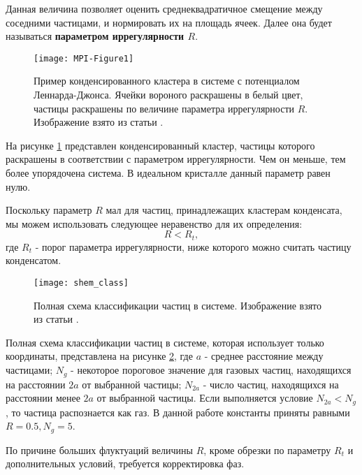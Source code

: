 Данная величина позволяет оценить среднеквадратичное смещение между соседними частицами, и нормировать их на площадь ячеек.
Далее она будет называться \textbf{параметром иррегулярности $R$}.

\begin{figure}[h]
\begin{center}
\texttt{[image: MPI-Figure1]}
\caption{Пример конденсированного кластера в системе с потенциалом Леннарда-Джонса. Ячейки вороного раскрашены в белый цвет, частицы раскрашены по величине параметра иррегулярности $R$. Изображение взято из статьи \cite{Ovcharov2017}.}
\label{risIrreg}
\end{center}
\end{figure}

На рисунке \ref{risIrreg} представлен конденсированный кластер, частицы которого раскрашены в соответствии с параметром иррегулярности. Чем он меньше, тем более упорядочена система. В идеальном кристалле данный параметр равен нулю.

Поскольку параметр $R$ мал для частиц, принадлежащих кластерам конденсата, мы можем использовать следующее неравенство для их определения:
\begin{equation}
R < R_t,
\end{equation}
где $R_t$ - порог параметра иррегулярности, ниже которого можно считать частицу конденсатом.

\begin{figure}[h]
\begin{center}
\texttt{[image: shem\_class]}
\caption{Полная схема классификации частиц в системе. Изображение взято из статьи \cite{Ovcharov2017}.}
\label{risShemClass}
\end{center}
\end{figure}

Полная схема классификации частиц в системе, которая использует только координаты, представлена на рисунке \ref{risShemClass},
где $a$ - среднее расстояние между частицами; $N_g$ - некоторое пороговое значение для газовых частиц, находящихся на расстоянии $2a$ от выбранной частицы; $N_{2a}$ - число частиц, находящихся на расстоянии менее $2a$ от выбранной частицы. Если выполняется условие $N_{2a} < N_{g}$, то частица распознается как газ.
В данной работе константы приняты равными $R = 0.5, N_g = 5$.

По причине больших флуктуаций величины $R$, кроме обрезки по параметру $R_t$ и дополнительных условий, требуется корректировка фаз.

